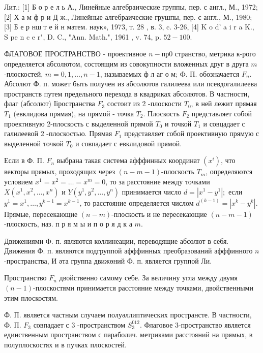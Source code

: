 \documentclass[10pt]{article}
\begin{document}
Лит.: [1] Б о р е л ь А., Линейные алгебраические группы, пер. с англ., М., 1972; [2] Х а м ф р и Д ж., Линейные алгебраические грушпы, пер. с англ., М., 1980; [3] Б е р нш т е й н матем. наук», 1973, т. 28 , в. 3, c. 3-26, [4] K o d' a i r a K., S pe n c e r", D. C., "Ann. Math.", 1961 , v. 74, p. $52-100$.



ФЛАГОВОЕ ПРОСТРАНСТВО - проективное $n-п р 0$ странство, метрика к-рого определяется абсолютом, состоящим из совокупности вложенных друг в друга $m$-плоскостей, $m=0,1, \ldots, n-1$, называемых ф л аг о м; Ф. П. обозначается $F_{n}$. Абсолют Ф. п. может быть получен из абсолютов галилеева или псевдогалилеева пространств путем предельного перехода в квадриках абсолютов. В частности, флаг (абсолют) Ііространства $F_{3}$ состоит из 2 -плоскости $T_{0}$, в ней лежит прямая $T_{1}$ (евклидова прямая), на прямой - точка $T_{2}$. Плоскость $F_{2}$ представляет собой проективную 2-плоскость с выделенной прямой $T_{0}$ и точкой $T_{1}$ и совцадает с галилеевой 2 -плоскостью. Прямая $F_{1}$ представляет собой проективную прямую с выделенной точкой $T_{0}$ и совпадает с евклидовой прямой.



Если в Ф. П. $F_{n}$ выбрана такая система афффинных координат $\left(x^{i}\right)$, что векторы прямых, проходящих через $(n-m-1)$-плоскость $T_{m}$, определяются условием $x^{1}=x^{2}=\ldots=x^{m}=0$, то за расстояние между точками $X\left(x^{1}, x^{2}, \ldots, x^{n}\right)$ и $Y\left(y^{1}, y^{2}, \ldots, y^{n}\right)$ принимается число $d=\left|x^{1}-y^{1}\right| ;$ если $y^{1}=x^{1}, \ldots, y^{k-1}=x^{k-1}$, то расстояние определяется числом $d^{(k-1)}=\left|x^{k}-y^{k}\right|$. Прямые, пересекающие $(n-m)$-плоскость и не пересекающие $(n-m-1)$-плоскость, наз. п р я м ы и п о р я д к а $m$.



Движениями Ф. п. являются коллинеации, переводящие абсолют в себя. Движения Ф. п. являются подгруппой афффинных преобразований афффинного $n$-пространства, И әта группа движөний Ф. п. является группой Ли.



Пространство $F_{n}$ двойственно самому себе. За величину угла между двумя $(n-1)$-плоскостями принимается расстояние между точками, двойственными этим плоскостям.



Ф. П. является частным случаем полуәллиптических пространсте. В частности, Ф. П. $F_{3}$ совпадает с 3 -пространством $S_{3}^{012}$. Флаговое 3-пространство является единственным пространством с параболич. метриками расстояний на прямых, в полуплоскостях и в пучках плоскостей.
\end{document}
